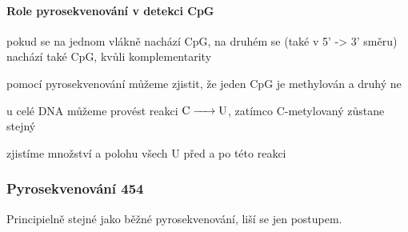 \documentclass[DIV=8]{scrreprt}
\begin{document}
\paragraph{Role pyrosekvenování v detekci CpG}
\begin{myItemize}[nosep]
    \item pokud se na jednom vlákně nachází CpG, na druhém se (také v 5' -> 3' směru) nachází také CpG, kvůli komplementarity
\begin{myItemize}[nosep]
    \item pomocí pyrosekvenování můžeme zjistit, že jeden CpG je methylován a druhý ne
\end{myItemize}

    \item u celé DNA můžeme provést reakci \(\ce{C -> U}\), zatímco C-metylovaný zůstane stejný
\begin{myItemize}[nosep]
    \item zjistíme množství a polohu všech U před a po této reakci
\end{myItemize}

\end{myItemize}



\subsubsection{Pyrosekvenování 454} \label{Pyrosekvenování 454}


Principielně stejné jako běžné pyrosekvenování, liší se jen postupem.
\end{document}
